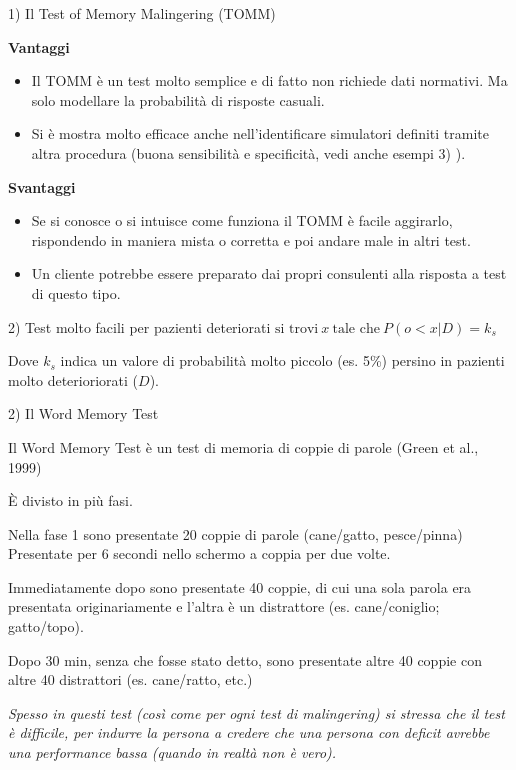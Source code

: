 \documentclass[
  ignorenonframetext,
]{beamer}
\providecommand{\tightlist}{%
  \setlength{\itemsep}{0pt}\setlength{\parskip}{0pt}}
\begin{document}
\begin{frame}{1) Il Test of Memory Malingering (TOMM)}
\label{il-test-of-memory-malingering-tomm-3}
\small

\textbf{Vantaggi}

\begin{itemize}
\tightlist
\item
  Il TOMM è un test molto semplice e di fatto non richiede dati
  normativi. Ma solo modellare la probabilità di risposte casuali.
\item
  Si è mostra molto efficace anche nell'identificare simulatori definiti
  tramite altra procedura (buona sensibilità e specificità, vedi anche
  esempi 3) ).
\end{itemize}

\textbf{Svantaggi}

\begin{itemize}
\tightlist
\item
  Se si conosce o si intuisce come funziona il TOMM è facile aggirarlo,
  rispondendo in maniera mista o corretta e poi andare male in altri
  test.
\item
  Un cliente potrebbe essere preparato dai propri consulenti alla
  risposta a test di questo tipo.
\end{itemize}
\end{frame}

\begin{frame}{2) Test molto facili per pazienti deteriorati}
\label{test-molto-facili-per-pazienti-deteriorati}
\vfill
{\center
$\text{si trovi}\ x\ \text{tale che}\ P(o < x | D) = k_s$
\vfill
}

Dove \(k_s\) indica un valore di probabilità molto piccolo (es. 5\%)
persino in pazienti molto deterioriorati (\(D\)).
\end{frame}

\begin{frame}{2) Il Word Memory Test}
\label{il-word-memory-test}
\small

Il Word Memory Test è un test di memoria di coppie di parole (Green et
al., 1999)

È divisto in più fasi.

Nella fase 1 sono presentate 20 coppie di parole (cane/gatto,
pesce/pinna) Presentate per 6 secondi nello schermo a coppia per due
volte.

Immediatamente dopo sono presentate 40 coppie, di cui una sola parola
era presentata originariamente e l'altra è un distrattore (es.
cane/coniglio; gatto/topo).

Dopo 30 min, senza che fosse stato detto, sono presentate altre 40
coppie con altre 40 distrattori (es. cane/ratto, etc.)

\emph{Spesso in questi test (così come per ogni test di malingering) si
stressa che il test è difficile, per indurre la persona a credere che
una persona con deficit avrebbe una performance bassa (quando in realtà
non è vero).}
\end{frame}
\end{document}
